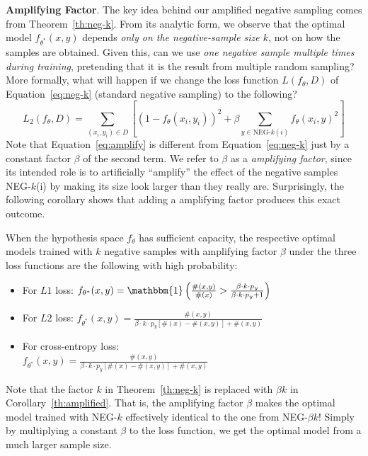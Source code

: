 \textbf{Amplifying Factor}.
The key idea behind our amplified negative sampling comes from Theorem~\ref{th:neg-k}. From its analytic form, we observe that the optimal model $f_{\theta^*}(x,y)$ depends \emph{only on the negative-sample size $k$}, not on how the samples are obtained. Given this, can we use \emph{one negative sample multiple times during training}, pretending that it is the result from multiple random sampling? More formally, what will happen if we change the loss function $L(f_{\theta},D)$ of Equation~\ref{eq:neg-k} (standard negative sampling) to the following?
\small
\begin{equation}
L_2(f_{\theta},D)\!=
\!\!\!\!\!\!\!\sum_{(x_i,y_i)\in D}\!\!\left[(1 - f_{\theta}(x_i, y_i))^2 + 
\beta\!\!\!\!\!\!\!\sum_{y \in \text{NEG-$k$}(i)}\!\!\!\!\!\!\! f_{\theta}(x_i, y)^2 \right]\label{eq:amplify}
\end{equation}
\normalsize
Note that Equation~\ref{eq:amplify} is different from Equation~\ref{eq:neg-k} just by a constant factor $\beta$ of the second term. We refer to $\beta$ as a \emph{amplifying factor}, since its intended role is to artificially ``amplify'' the effect of the negative samples NEG-$k$(i) by making its size look larger than they really are. %
Surprisingly, the following corollary shows that adding a amplifying factor produces this exact outcome.
\begin{corollary}\label{th:amplified}
	When the hypothesis space $f_{\theta}$ has sufficient capacity,
	the respective optimal models trained with $k$ negative samples with amplifying factor $\beta$ under the three loss functions are the following with high probability:
	\small
	\begin{itemize}
		\setlength\itemsep{-0.2em}
		\item For $L1$ loss: $f_{\theta^*}(x,y) = \mathbbm{1}\left(\frac{\#(x,y)}{\#(x)} > \frac{\beta \cdot k \cdot p_y}{\beta \cdot k \cdot p_y + 1}\right)$
		\item For $L2$ loss:  $f_{\theta^*}(x,y) = \frac{\#(x,y)}{\beta \cdot k \cdot p_y [\#(x)- \#(x,y)] + \#(x,y)}$
		\item For cross-entropy loss:\\ 
		$f_{\theta^*}(x,y) = \frac{\#(x,y)}{\beta \cdot k \cdot p_y [\#(x)- \#(x,y)] + \#(x,y)}$
	\end{itemize}
	\normalsize
\end{corollary}
Note that the factor $k$ in Theorem~\ref{th:neg-k} is replaced with $\beta k$ in Corollary~\ref{th:amplified}. That is, the amplifying factor $\beta$ makes the optimal model trained with NEG-$k$ effectively identical to the one from NEG-$\beta k$! Simply by multiplying a constant $\beta$ to the loss function, we get the optimal model from a much larger sample size. 

